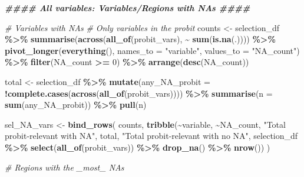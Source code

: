 \documentclass[
]{article}
\newenvironment{Shaded}{\begin{snugshade}}{\end{snugshade}}
\newcommand{\AttributeTok}[1]{\textcolor[rgb]{0.13,0.29,0.53}{#1}}
\newcommand{\CommentTok}[1]{\textcolor[rgb]{0.56,0.35,0.01}{\textit{#1}}}
\newcommand{\DecValTok}[1]{\textcolor[rgb]{0.00,0.00,0.81}{#1}}
\newcommand{\DocumentationTok}[1]{\textcolor[rgb]{0.56,0.35,0.01}{\textbf{\textit{#1}}}}
\newcommand{\FunctionTok}[1]{\textcolor[rgb]{0.13,0.29,0.53}{\textbf{#1}}}
\newcommand{\NormalTok}[1]{#1}
\newcommand{\OtherTok}[1]{\textcolor[rgb]{0.56,0.35,0.01}{#1}}
\newcommand{\SpecialCharTok}[1]{\textcolor[rgb]{0.81,0.36,0.00}{\textbf{#1}}}
\newcommand{\StringTok}[1]{\textcolor[rgb]{0.31,0.60,0.02}{#1}}
\begin{document}
\begin{Shaded}
\begin{Highlighting}[]
\DocumentationTok{\#\#\#\# All variables: Variables/Regions with NAs \#\#\#\#}


\CommentTok{\# Variables with NAs}
\CommentTok{\# Only variables in the probit}
\NormalTok{counts }\OtherTok{\textless{}{-}}\NormalTok{ selection\_df }\SpecialCharTok{\%\textgreater{}\%}
  \FunctionTok{summarise}\NormalTok{(}\FunctionTok{across}\NormalTok{(}\FunctionTok{all\_of}\NormalTok{(probit\_vars), }\SpecialCharTok{\textasciitilde{}} \FunctionTok{sum}\NormalTok{(}\FunctionTok{is.na}\NormalTok{(.)))) }\SpecialCharTok{\%\textgreater{}\%}
  \FunctionTok{pivot\_longer}\NormalTok{(}\FunctionTok{everything}\NormalTok{(), }\AttributeTok{names\_to =} \StringTok{"variable"}\NormalTok{, }\AttributeTok{values\_to =} \StringTok{"NA\_count"}\NormalTok{) }\SpecialCharTok{\%\textgreater{}\%}
  \FunctionTok{filter}\NormalTok{(NA\_count }\SpecialCharTok{\textgreater{}=} \DecValTok{0}\NormalTok{) }\SpecialCharTok{\%\textgreater{}\%}
  \FunctionTok{arrange}\NormalTok{(}\FunctionTok{desc}\NormalTok{(NA\_count))}

\NormalTok{total }\OtherTok{\textless{}{-}}\NormalTok{ selection\_df }\SpecialCharTok{\%\textgreater{}\%}
  \FunctionTok{mutate}\NormalTok{(}\AttributeTok{any\_NA\_probit =} \SpecialCharTok{!}\FunctionTok{complete.cases}\NormalTok{(}\FunctionTok{across}\NormalTok{(}\FunctionTok{all\_of}\NormalTok{(probit\_vars)))) }\SpecialCharTok{\%\textgreater{}\%}
  \FunctionTok{summarise}\NormalTok{(}\AttributeTok{n =} \FunctionTok{sum}\NormalTok{(any\_NA\_probit)) }\SpecialCharTok{\%\textgreater{}\%}
  \FunctionTok{pull}\NormalTok{(n)}

\NormalTok{sel\_NA\_vars }\OtherTok{\textless{}{-}} \FunctionTok{bind\_rows}\NormalTok{(}
\NormalTok{  counts,}
  \FunctionTok{tribble}\NormalTok{(}\SpecialCharTok{\textasciitilde{}}\NormalTok{variable, }\SpecialCharTok{\textasciitilde{}}\NormalTok{NA\_count,}
          \StringTok{"Total probit{-}relevant with NA"}\NormalTok{, total,}
          \StringTok{"Total probit{-}relevant with no NA"}\NormalTok{, selection\_df }\SpecialCharTok{\%\textgreater{}\%} 
            \FunctionTok{select}\NormalTok{(}\FunctionTok{all\_of}\NormalTok{(probit\_vars)) }\SpecialCharTok{\%\textgreater{}\%}
            \FunctionTok{drop\_na}\NormalTok{() }\SpecialCharTok{\%\textgreater{}\%} \FunctionTok{nrow}\NormalTok{())}
\NormalTok{  )}


\CommentTok{\# Regions with the \_most\_ NAs}


\end{Highlighting}
\end{Shaded}
\end{document}
